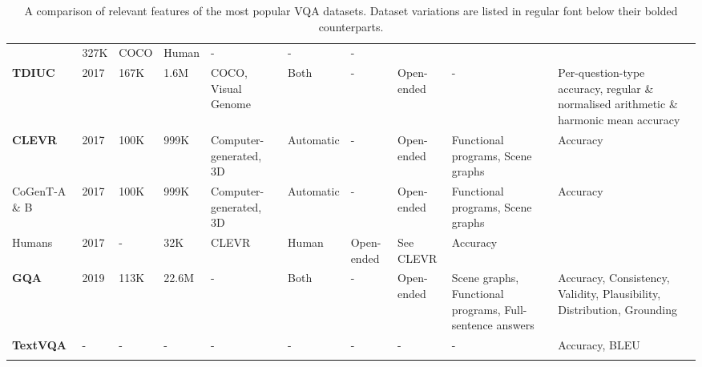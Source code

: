 \begin{landscape}
\begin{footnotesize}
\begin{center}
\begin{xltabular}{\linewidth}{LlllLLLLLL}
          & 327K %
          & COCO
          & Human
          & -
          & -
          & - \\
          \textbf{TDIUC} \cite{kafle2017analysis}
          & 2017
          & 167K %
          & 1.6M %
          & COCO, Visual Genome
          & Both
          & -
          & Open-ended
          & -
          & Per-question-type accuracy, regular \& normalised arithmetic \& harmonic mean accuracy\\
          \textbf{CLEVR} \cite{johnson2017clevr}
          & 2017
          & 100K  %
          & 999K  %
          & Computer-generated, 3D
          & Automatic
          & -
          & Open-ended
          & Functional programs, Scene graphs
          & Accuracy \\
          CoGenT-A \& B
          & 2017
          & 100K
          & 999K
          & Computer-generated, 3D 
          & Automatic
          & -
          & Open-ended
          & Functional programs, Scene graphs
          & Accuracy \\
          Humans
          & 2017
          & -
          & 32K  %
          & CLEVR
          & Human
          & Open-ended
          & See CLEVR
          & Accuracy \\
          \textbf{GQA} \cite{hudson2019gqa}
          & 2019
          & 113K  %
          & 22.6M  %
          & -
          & Both
          & -
          & Open-ended
          & Scene graphs, Functional programs, Full-sentence answers
          & Accuracy, Consistency, Validity, Plausibility, Distribution, Grounding \\
          \textbf{TextVQA} \cite{singh2019towards}
          & -
          & -
          & -
          & -
          & -
          & -
          & -
          & -
          & Accuracy, BLEU \\
          \bottomrule
          \caption[A comparison of VQA datasets and their variations.]{A comparison of relevant features of the most popular VQA datasets. Dataset variations are listed in regular font below their bolded counterparts.}
          \label{tab:dataset_comparison}
          \end{xltabular}
      \end{center}
  \end{footnotesize}
\end{landscape}

